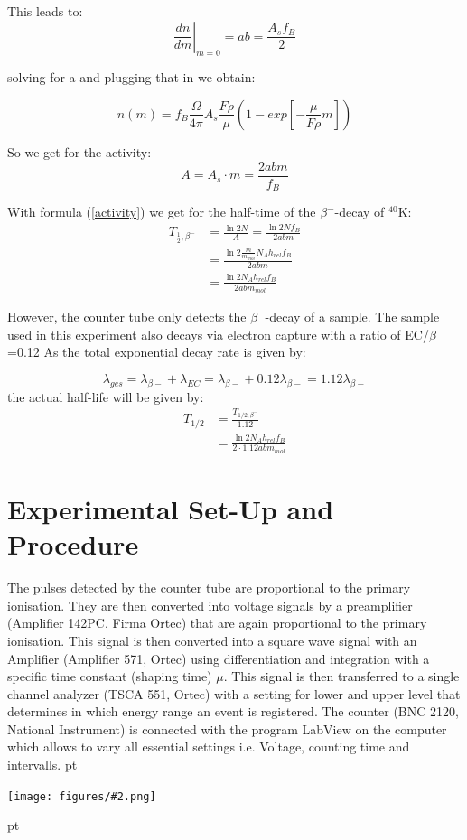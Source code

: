 \documentclass[12pt]{article}
\newcommand{\gra}[3][0.7]{
	\begin{minipage}[h!]{\textwidth}
		\centering
		\texttt{[image: figures/\#2.png]}
		\captionof{figure}{#3}
	\end{minipage}
	\vskip 30 pt
	}
\begin{document}
This leads to:
\[\left. \frac{dn}{dm}\right| _{m=0} = ab = \frac{A_s f_B}{2}\]

solving for a and plugging that in we obtain:

\[n(m) = f_B\frac{\Omega}{4\pi}A_s\frac{F\rho}{\mu}\left( 1-exp\left[ -\frac{\mu}{F\rho}m\right] \right) \]

So we get for the activity: $$A=A_s\cdot m=\frac{2abm}{f_B}$$

With formula (\ref{activity}) we get for the half-time of the $\beta^-$-decay of $^{40}$K:
\begin{align*}
	T_{\frac12,\beta^-}&=\frac{\ln2N}{A}=\frac{\ln2Nf_B}{2abm}\\&=\frac{\ln2\frac{m}{m_{mol}}N_Ah_{rel}f_B}{2abm}\\&=\frac{\ln2N_Ah_{rel}f_B}{2abm_{mol}}
\end{align*}

However, the counter tube only detects the $\beta^-$-decay of a sample. The sample used in this experiment also decays via electron capture with a ratio of EC/$\beta^-$=0.12
As the total exponential decay rate is given by:

\[\lambda_{ges} = \lambda_{\beta-} + \lambda_{EC} = \lambda_{\beta-}+0.12\lambda_{\beta-} = 1.12\lambda_{\beta-}\]
the actual half-life will be given by:
\begin{align}
	T_{1/2} &= \frac{T_{1/2,\beta^-}}{1.12}\\
	&=\frac{\ln2N_Ah_{rel}f_B}{2\cdot1.12abm_{mol}}\label{halftimeKa}
\end{align}

 

 

 

 
\newpage
\section{Experimental Set-Up and Procedure }
The pulses detected by the counter tube are proportional to the primary ionisation. They are then converted into voltage signals by a preamplifier (Amplifier 142PC, Firma Ortec) that are again proportional to the primary ionisation. This signal is then converted into a square wave signal with an Amplifier (Amplifier 571, Ortec) using differentiation and integration with a specific time constant (shaping time) $\mu$. This signal is then transferred to a single channel analyzer (TSCA 551, Ortec) with a setting for lower and upper level that determines in which energy range an event is registered. The counter (BNC 2120, National Instrument) is connected with  the program LabView on the computer which allows to vary all essential settings i.e. Voltage, counting time and intervalls.
 pt
\gra[0.8]{Versuchsaufbau}{Experimental Set-Up}
\end{document}
